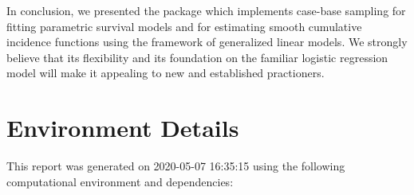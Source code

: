 \documentclass[
]{jss}
\begin{document}
In conclusion, we presented the  package 
which implements case-base sampling for fitting parametric survival
models and for estimating smooth cumulative incidence functions using
the framework of generalized linear models. We strongly believe that its
flexibility and its foundation on the familiar logistic regression model
will make it appealing to new and established practioners.

\hypertarget{environment-details}{%
\section{Environment Details}\label{environment-details}}

This report was generated on 2020-05-07 16:35:15 using the following
computational environment and dependencies:
\end{document}
